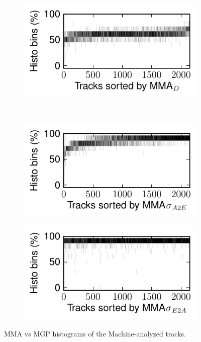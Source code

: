 \documentclass{article}
\begin{document}
\begin{figure}
      \begin{subfigure}[b]{0.25\textwidth}
              \includegraphics[width=\textwidth]{plots/histo-D-trim.pdf}
              \caption{}
              \label{fig:histo-D-trim}
      \end{subfigure}%
      ~ 
      \begin{subfigure}[b]{0.25\textwidth}
              \includegraphics[width=\textwidth]{plots/histo-DevA2E-trim.pdf}
              \caption{}
              \label{fig:histo-DevA2E-trim}
      \end{subfigure}%
       
      \begin{subfigure}[b]{0.25\textwidth}
              \includegraphics[width=\textwidth]{plots/histo-DevE2A-trim.pdf}
              \caption{}
              \label{fig:histo-DevE2A-trim}
      \end{subfigure}%

      \caption{MMA vs MGP histograms of the Machine-analyzed tracks.}\label{fig:machine-eval-trim}
\end{figure}
\end{document}
